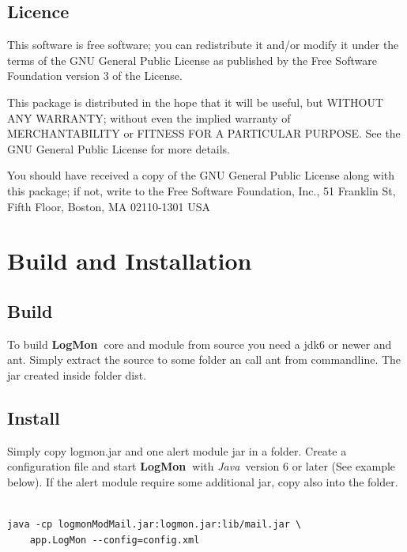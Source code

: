 \documentclass[11pt,a4paper]{article}
\newcommand{\logmon}{\textbf{LogMon\ }}
\newcommand{\java}{\textit{Java\ }}
\begin{document}
\subsection{Licence}

   This software is free software; you can redistribute it and/or modify
   it under the terms of the GNU General Public License as published by
   the Free Software Foundation version 3 of the License.

   This package is distributed in the hope that it will be useful,
   but WITHOUT ANY WARRANTY; without even the implied warranty of
   MERCHANTABILITY or FITNESS FOR A PARTICULAR PURPOSE.  See the
   GNU General Public License for more details.

   You should have received a copy of the GNU General Public License
   along with this package; if not, write to the Free Software
   Foundation, Inc., 51 Franklin St, Fifth Floor, Boston, MA  02110-1301 USA

\section{Build and Installation}

\subsection{Build}

To build \logmon core and module from source you need a jdk6 or newer and ant.
Simply extract the source to some folder an call ant from commandline. 
The jar created inside folder dist.

\subsection{Install}
Simply copy logmon.jar and one alert module jar in a folder. Create a
configuration file and start \logmon with \java version 6 or later (See example
below). If the alert module require some additional jar, copy also into the
folder.

\begin{verbatim}

java -cp logmonModMail.jar:logmon.jar:lib/mail.jar \
    app.LogMon --config=config.xml

\end{verbatim}

\end{document}
